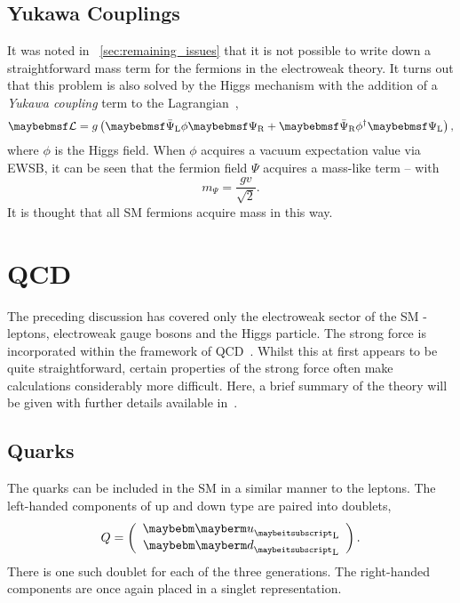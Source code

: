 \subsection{Yukawa Couplings}
\label{sec:theory_yukawa}
It was noted in \sec~\ref{sec:remaining_issues} that it is not possible to write
down a straightforward mass term for the fermions in the electroweak theory. It
turns out that this problem is also solved by the Higgs mechanism with the
addition of a \emph{Yukawa coupling} term to the
Lagrangian~\cite{peskin_schroeder},
\begin{equation*}
\lagrangiand = g \left(\APsiL \phi \PsiR + \APsiR\phi^{\dagger}\PsiL\right),
\end{equation*}
where $\phi$ is the Higgs field. When $\phi$ acquires a vacuum expectation value
via \ac{EWSB}, it can be seen that the fermion field $\Psi$ acquires a mass-like
term -- with
\begin{equation*}
m_{\Psi} = \frac{gv}{\sqrt{2}}.
\end{equation*}
It is thought that all \ac{SM} fermions acquire mass in this way.

\section{\acl{QCD}}
\label{sec:sm_qcd}
The preceding discussion has covered only the electroweak sector of the \ac{SM}
- leptons, electroweak gauge bosons and the Higgs particle. The strong force is
incorporated within the framework of \ac{QCD}~\cite{peskin_schroeder,pink_book}.
Whilst this at first appears to be quite straightforward, certain properties of
the strong force often make calculations considerably more difficult. Here, a
brief summary of the theory will be given with further details available
in~\cite{pink_book}.

\subsection{Quarks}
The quarks can be included in the \ac{SM} in a similar manner to the
leptons. The left-handed components of up and down type are paired into doublets,
\begin{equation*}
Q=\left(\begin{array}{c}\Pup_{\textrm{L}} \\ \Pdown_{\textrm{L}}\end{array}\right).
\end{equation*}
There is one such doublet for each of the three generations. The right-handed
components are once again placed in a singlet representation.

